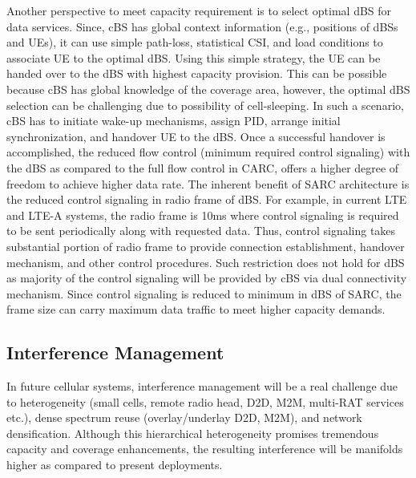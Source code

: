\documentclass[article,10pt,twocolumn]{IEEEtran}
\begin{document}
Another perspective to meet capacity requirement is to select optimal dBS for data services. Since, cBS has global context information (e.g., positions of dBSs and UEs), it can use simple path-loss, statistical CSI, and load conditions to associate UE to the optimal dBS. Using this simple strategy, the UE can be handed over to the dBS with highest capacity provision. This can be possible because cBS has global knowledge of the coverage area, however, the optimal dBS selection can be challenging due to possibility of cell-sleeping. In such a scenario, cBS has to initiate wake-up mechanisms, assign PID, arrange initial synchronization, and  handover UE to the dBS. Once a successful handover is accomplished, the reduced flow control (minimum required control signaling) with the dBS as compared to the full flow control in CARC, offers a higher degree of freedom to achieve higher data rate. The inherent benefit of SARC architecture is the reduced control signaling in radio frame of dBS. For example, in current LTE and LTE-A systems, the radio frame is 10ms where control signaling is required to be sent periodically along with requested data. Thus, control signaling takes substantial portion of radio frame to provide connection establishment, handover mechanism, and other control procedures. Such restriction does not hold for dBS as majority of the control signaling will be provided by cBS via dual connectivity mechanism. Since control signaling is reduced to minimum in dBS of SARC, the frame size can carry maximum data traffic to meet higher capacity demands.
\subsection{Interference Management}\label{sec:imanag}
In future cellular systems, interference management will be a real challenge due to heterogeneity (small cells, remote radio head, D2D, M2M, multi-RAT services etc.), dense spectrum reuse (overlay/underlay D2D, M2M), and network densification. Although this hierarchical heterogeneity promises tremendous capacity and coverage enhancements, the resulting interference will be manifolds higher as compared to present deployments.
\end{document}
